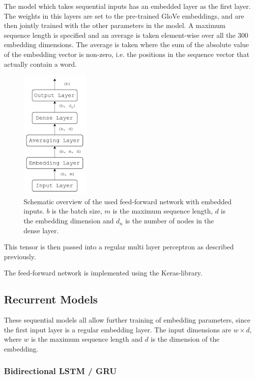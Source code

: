 The model which takes sequential inputs has an embedded layer as the first layer. The weights in this layers are set to the pre-trained GloVe embeddings, and are then jointly trained with the other parameters in the model. A maximum sequence length is specified and an average is taken element-wise over all the 300 embedding dimensions. The average is taken where the sum of the absolute value of the embedding vector is non-zero, i.e. the positions in the sequence vector that actually contain a word.

\begin{figure}[H]
    \centering
    \includegraphics[width=0.3\textwidth]{Figures/figs-ff_emb.pdf}
    \caption{Schematic overview of the used feed-forward network with embedded inputs. $b$ is the batch size, $m$ is the maximum sequence length, $d$ is the embedding dimension and $d_n$ is the number of nodes in the dense layer.}
\label{fig:emb_ff}
\end{figure}

This tensor is then passed into a regular multi layer perceptron as described previously.

The feed-forward network is implemented using the Keras-library. 

\subsection{Recurrent Models}

These sequential models all allow further training of embedding parameters, since the first input layer is a regular embedding layer. The input dimensions are $w \times d$, where $w$ is the maximum sequence length and $d$ is the dimension of the embedding. 

\subsubsection*{Bidirectional LSTM / GRU}

